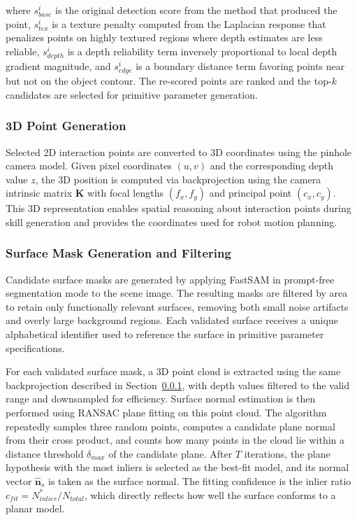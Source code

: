 where $s_{base}^i$ is the original detection score from the method that produced the point, $s_{tex}^i$ is a texture penalty computed from the Laplacian response that penalizes points on highly textured regions where depth estimates are less reliable, $s_{depth}^i$ is a depth reliability term inversely proportional to local depth gradient magnitude, and $s_{edge}^i$ is a boundary distance term favoring points near but not on the object contour. The re-scored points are ranked and the top-$k$ candidates are selected for primitive parameter generation.

\subsubsection{3D Point Generation}
\label{subsubsec:3d_point_generation}

Selected 2D interaction points are converted to 3D coordinates using the pinhole camera model. Given pixel coordinates $(u, v)$ and the corresponding depth value $z$, the 3D position is computed via backprojection using the camera intrinsic matrix $\mathbf{K}$ with focal lengths $(f_x, f_y)$ and principal point $(c_x, c_y)$. This 3D representation enables spatial reasoning about interaction points during skill generation and provides the coordinates used for robot motion planning.

\subsubsection{Surface Mask Generation and Filtering}
\label{subsubsec:surface_filtering}

Candidate surface masks are generated by applying FastSAM in prompt-free segmentation mode to the scene image. The resulting masks are filtered by area to retain only functionally relevant surfaces, removing both small noise artifacts and overly large background regions. Each validated surface receives a unique alphabetical identifier used to reference the surface in primitive parameter specifications.

For each validated surface mask, a 3D point cloud is extracted using the same backprojection described in Section~\ref{subsubsec:3d_point_generation}, with depth values filtered to the valid range and downsampled for efficiency. Surface normal estimation is then performed using RANSAC plane fitting on this point cloud. The algorithm repeatedly samples three random points, computes a candidate plane normal from their cross product, and counts how many points in the cloud lie within a distance threshold $\delta_{max}$ of the candidate plane. After $T$ iterations, the plane hypothesis with the most inliers is selected as the best-fit model, and its normal vector $\hat{\mathbf{n}}_s$ is taken as the surface normal. The fitting confidence is the inlier ratio $c_{fit} = N_{inlier}^* / N_{total}$, which directly reflects how well the surface conforms to a planar model.

